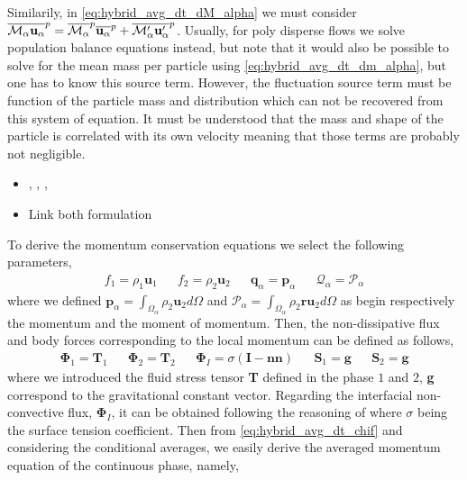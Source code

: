Similarily, in \ref{eq:hybrid_avg_dt_dM_alpha} we must consider  $\overline{\mathcal{M}_\alpha \textbf{u}_\alpha}^{p} = \overline{\mathcal{M}_\alpha}^{p} \overline{\textbf{u}_\alpha}^{p} + \overline{\mathcal{M}'_\alpha \textbf{u}'_\alpha}^{p}$.
Usually, for poly disperse flows we solve population balance equations instead, but note that it would also be possible to solve for the mean mass per particle using \ref{eq:hybrid_avg_dt_dm_alpha}, but one has to know this source term. 
However, the fluctuation source term must be function of the particle mass and distribution which can not be recovered from this system of equation. 
It must be understood that the mass and shape of the particle is correlated with its own velocity meaning that those terms are probably not negligible. 
\begin{itemize}
    \item \citet{morel2010comparison} , \citet{marchisio2005solution}, \citet{KAMP20011363}, \citet{zaepffel2012multisize}
    \item Link both formulation
\end{itemize}
To derive the momentum conservation equations we select the following parameters, 
\begin{align*}
    f_1 = \rho_1 \textbf{u}_1          
    && f_2 =  \rho_2 \textbf{u}_2
    && \textbf{q}_\alpha = \textbf{p}_\alpha 
    && \mathcal{Q}_\alpha = \mathcal{P}_\alpha
\end{align*} 
where we defined $\textbf{p}_\alpha= \int_{\Omega_\alpha} \rho_2 \textbf{u}_2  d\Omega$ and $\mathcal{P}_\alpha= \int_{\Omega_\alpha} \rho_2 \textbf{ru}_2  d\Omega$ as begin respectively the momentum and the moment of momentum. 
Then, the non-dissipative flux and body forces corresponding to the local momentum can be defined as follows,
\begin{align*}
    \mathbf{\Phi}_1 = \textbf{T}_1
    &&  \mathbf{\Phi}_2  =  \textbf{T}_2
    &&  \mathbf{\Phi}_I  =  \sigma (\textbf{I} - \textbf{nn}) 
    &&  \textbf{S}_1 = \textbf{g}       
    &&  \textbf{S}_2    =  \textbf{g}         
\end{align*} 
where we introduced the fluid stress tensor \textbf{T} defined in the phase $1$ and $2$, \textbf{g} correspond to the gravitational constant vector.
Regarding the interfacial non-convective flux, $\mathbf{\Phi}_I$, it can be obtained following the reasoning of \citet[Chapter 2]{tryggvason2011direct} where $\sigma$ being the surface tension coefficient. 
Then from \ref{eq:hybrid_avg_dt_chif} and considering the conditional averages, we easily derive the averaged momentum  equation of the continuous phase, namely, 
